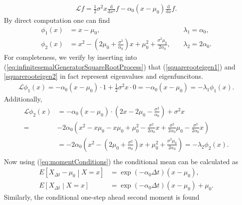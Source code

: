 \begin{align}
    \mathcal{L}f = \frac{1}{2}\sigma^2x\frac{\mathrm{d}}{\mathrm{d}x^2}f -\alpha_0\left(x - \mu_0\right)\frac{\mathrm{d}}{\mathrm{d}x}f. \label{eq:infinitesemalGeneratorSquareRootProcess}
\end{align}
By direct computation one can find 
\begin{align}
    \phi_1(x) &= x-\mu_0, &&\; \lambda_1 = \alpha_0, \label{squarerooteigen1}\\
    \phi_2(x) &= x^2 - \left(2\mu_0 + \frac{\sigma^2}{\alpha_0}\right)x + \mu_0^2 + \frac{\sigma^2\mu_0}{2\alpha_0}, &&\; \lambda_2 = 2\alpha_0. \label{squarerooteigen2}
\end{align}
For completeness, we verify by inserting into (\ref{eq:infinitesemalGeneratorSquareRootProcess}) that (\ref{squarerooteigen1}) and \ref{squarerooteigen2} in fact represent eigenvalues and eigenfuncitons.
\begin{align}
    \mathcal{L}\phi_1(x) = -\alpha_0\left(x - \mu_0\right)\cdot 1 + \frac{1}{2}\sigma^2 x \cdot 0 = -\alpha_0\left(x - \mu_0\right) = -\lambda_1\phi_1(x). \label{eq:directVerificationCondMean}
\end{align}
Additionally,
\begin{align}
    \mathcal{L}\phi_2(x) &= -\alpha_0\left(x - \mu_0\right)\cdot \left(2x -2\mu_0 - \frac{\sigma^2}{\alpha_0}\right) + \sigma^2x\\
    =& -2\alpha_0\left(x^2-x\mu_0 - x\mu_0 + \mu_0^2 -\frac{\sigma^2}{2\alpha_0}x + \frac{\sigma^2}{2\alpha_0}\mu_0 - \frac{\sigma^2}{2\alpha_0}x \right)\\
    &= -2\alpha_0 \left(x^2 -\left(2\mu_0+\frac{\sigma^2}{\alpha_0}\right)x + \mu_0^2 + \frac{\sigma^2\mu_0}{2\alpha_0}\right) = -\lambda_2\phi_2(x).\\
\end{align}
Now using (\ref{eq:momentConditions}) the conditional mean can be calculated as
\begin{align}
    E\left[X_{\Delta t} - \mu_0 \middle| X = x\right] &= \exp\left(-\alpha_0\Delta t\right)\left(x-\mu_0\right),\\
    E\left[X_{\Delta t} \middle| X = x\right] &= \exp\left(-\alpha_0\Delta t\right)\left(x-\mu_0\right) + \mu_0. \label{eq:squarerootCondMean}
\end{align}
Similarly, the conditional one-step ahead second moment is found
